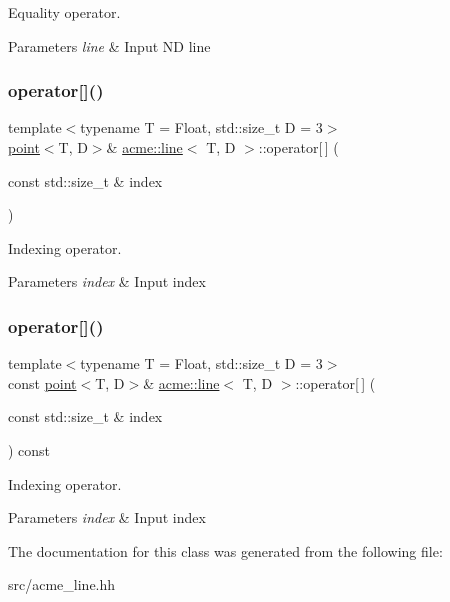 Equality operator. 


\begin{DoxyParams}{Parameters}
{\em line} & Input ND line \\
\hline
\end{DoxyParams}
\mbox{\label{classacme_1_1line_a1db4409de6ae4339a8becc64aa9c9523}} 
\subsubsection{\texorpdfstring{operator[]()}{operator[]()}\hspace{0.1cm}{\footnotesize\ttfamily [1/2]}}
{\footnotesize\ttfamily template$<$typename T = Float, std\+::size\+\_\+t D = 3$>$ \\
\hyperlink{classacme_1_1point}{point}$<$T, D$>$\& \hyperlink{classacme_1_1line}{acme\+::line}$<$ T, D $>$\+::operator\mbox{[}$\,$\mbox{]} (\begin{DoxyParamCaption}\item[{const std\+::size\+\_\+t \&}]{index }\end{DoxyParamCaption})\hspace{0.3cm}{\ttfamily [inline]}}



Indexing operator. 


\begin{DoxyParams}{Parameters}
{\em index} & Input index \\
\hline
\end{DoxyParams}
\mbox{\label{classacme_1_1line_a8de20bf04835db679b40e1e57bfb93ad}} 
\subsubsection{\texorpdfstring{operator[]()}{operator[]()}\hspace{0.1cm}{\footnotesize\ttfamily [2/2]}}
{\footnotesize\ttfamily template$<$typename T = Float, std\+::size\+\_\+t D = 3$>$ \\
const \hyperlink{classacme_1_1point}{point}$<$T, D$>$\& \hyperlink{classacme_1_1line}{acme\+::line}$<$ T, D $>$\+::operator\mbox{[}$\,$\mbox{]} (\begin{DoxyParamCaption}\item[{const std\+::size\+\_\+t \&}]{index }\end{DoxyParamCaption}) const\hspace{0.3cm}{\ttfamily [inline]}}



Indexing operator. 


\begin{DoxyParams}{Parameters}
{\em index} & Input index \\
\hline
\end{DoxyParams}


The documentation for this class was generated from the following file\+:\begin{DoxyCompactItemize}
\item 
src/acme\+\_\+line.\+hh\end{DoxyCompactItemize}
